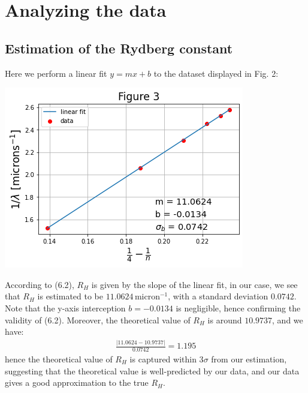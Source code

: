 \documentclass[11pt]{book}
\theoremstyle{break}
\theoremstyle{break}
\begin{document}
\hfill\break
\hfill\break

\section{Analyzing the data}
\subsection{Estimation of the Rydberg constant}
Here we perform a linear fit $y = mx+b$ to the dataset displayed in Fig. 2:
\begin{center}
\includegraphics[scale=0.55]{3}
\end{center}
According to (6.2), $R_H$ is given by the slope of the linear fit, in our case, we see that $R_H$ is estimated to be $11.0624 \, \text{micron}^{-1}$, with a standard deviation $0.0742$. Note that the y-axis interception $b = -0.0134$ is negligible, hence confirming the validity of (6.2). Moreover, the theoretical value of $R_H$ is around $10.9737$, and we have:
\begin{align*}
\frac{|11.0624 - 10.9737|}{0.0742} = 1.195
\end{align*}
hence the theoretical value of $R_H$ is captured within 3$\sigma$ from our estimation, suggesting that the theoretical value is well-predicted by our data, and our data gives a good approximation to the true $R_H$.
\end{document}
